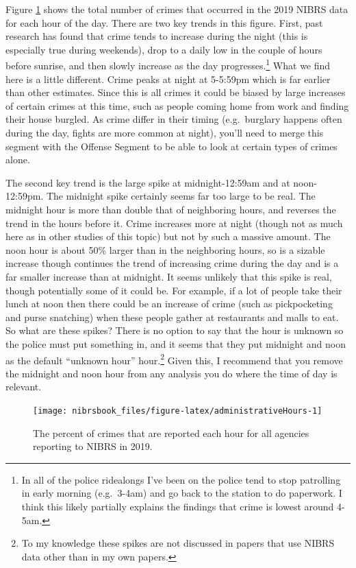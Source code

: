 \documentclass[
  12pt,
  openany]{book}
\begin{document}
Figure \ref{fig:administrativeHours} shows the total number of crimes that occurred in the 2019 NIBRS data for each hour of the day. There are two key trends in this figure. First, past research has found that crime tends to increase during the night (this is especially true during weekends), drop to a daily low in the couple of hours before sunrise, and then slowly increase as the day progresses.\footnote{In all of the police ridealongs I've been on the police tend to stop patrolling in early morning (e.g.~3-4am) and go back to the station to do paperwork. I think this likely partially explains the findings that crime is lowest around 4-5am.} What we find here is a little different. Crime peaks at night at 5-5:59pm which is far earlier than other estimates. Since this is all crimes it could be biased by large increases of certain crimes at this time, such as people coming home from work and finding their house burgled. As crime differ in their timing (e.g.~burglary happens often during the day, fights are more common at night), you'll need to merge this segment with the Offense Segment to be able to look at certain types of crimes alone.

The second key trend is the large spike at midnight-12:59am and at noon-12:59pm. The midnight spike certainly seems far too large to be real. The midnight hour is more than double that of neighboring hours, and reverses the trend in the hours before it. Crime increases more at night (though not as much here as in other studies of this topic) but not by such a massive amount. The noon hour is about 50\% larger than in the neighboring hours, so is a sizable increase though continues the trend of increasing crime during the day and is a far smaller increase than at midnight. It seems unlikely that this spike is real, though potentially some of it could be. For example, if a lot of people take their lunch at noon then there could be an increase of crime (such as pickpocketing and purse snatching) when these people gather at restaurants and malls to eat. So what are these spikes? There is no option to say that the hour is unknown so the police must put something in, and it seems that they put midnight and noon as the default ``unknown hour'' hour.\footnote{To my knowledge these spikes are not discussed in papers that use NIBRS data other than in my own papers.} Given this, I recommend that you remove the midnight and noon hour from any analysis you do where the time of day is relevant.

\begin{figure}

{\centering \texttt{[image: nibrsbook\_files/figure-latex/administrativeHours-1]} 

}

\caption{The percent of crimes that are reported each hour for all agencies reporting to NIBRS in 2019.}\label{fig:administrativeHours}
\end{figure}
\end{document}
